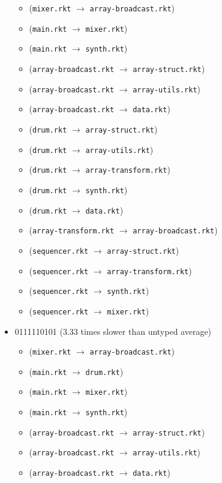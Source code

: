 \documentclass{article}
\newcommand{\mono}[1]{\texttt{#1}}
\begin{document}
\begin{itemize}
  \begin{itemize}
  \item (\mono{mixer.rkt} $\rightarrow$ \mono{array-broadcast.rkt})
  \item (\mono{main.rkt} $\rightarrow$ \mono{mixer.rkt})
  \item (\mono{main.rkt} $\rightarrow$ \mono{synth.rkt})
  \item (\mono{array-broadcast.rkt} $\rightarrow$ \mono{array-struct.rkt})
  \item (\mono{array-broadcast.rkt} $\rightarrow$ \mono{array-utils.rkt})
  \item (\mono{array-broadcast.rkt} $\rightarrow$ \mono{data.rkt})
  \item (\mono{drum.rkt} $\rightarrow$ \mono{array-struct.rkt})
  \item (\mono{drum.rkt} $\rightarrow$ \mono{array-utils.rkt})
  \item (\mono{drum.rkt} $\rightarrow$ \mono{array-transform.rkt})
  \item (\mono{drum.rkt} $\rightarrow$ \mono{synth.rkt})
  \item (\mono{drum.rkt} $\rightarrow$ \mono{data.rkt})
  \item (\mono{array-transform.rkt} $\rightarrow$ \mono{array-broadcast.rkt})
  \item (\mono{sequencer.rkt} $\rightarrow$ \mono{array-struct.rkt})
  \item (\mono{sequencer.rkt} $\rightarrow$ \mono{array-transform.rkt})
  \item (\mono{sequencer.rkt} $\rightarrow$ \mono{synth.rkt})
  \item (\mono{sequencer.rkt} $\rightarrow$ \mono{mixer.rkt})
  \end{itemize}
\item 0111110101 (3.33 times slower than untyped average)
  \begin{itemize}
  \item (\mono{mixer.rkt} $\rightarrow$ \mono{array-broadcast.rkt})
  \item (\mono{main.rkt} $\rightarrow$ \mono{drum.rkt})
  \item (\mono{main.rkt} $\rightarrow$ \mono{mixer.rkt})
  \item (\mono{main.rkt} $\rightarrow$ \mono{synth.rkt})
  \item (\mono{array-broadcast.rkt} $\rightarrow$ \mono{array-struct.rkt})
  \item (\mono{array-broadcast.rkt} $\rightarrow$ \mono{array-utils.rkt})
  \item (\mono{array-broadcast.rkt} $\rightarrow$ \mono{data.rkt})

\end{itemize}
\end{itemize}
\end{document}
